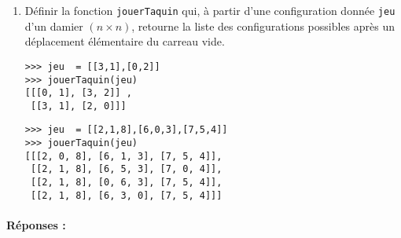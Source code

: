 \documentclass[11pt,a4paper]{article}
\begin{document}
\begin{enumerate}
\item Définir la fonction \texttt{jouerTaquin} qui, à partir d'une configuration 
	donnée \texttt{jeu} d'un damier $(n\times n)$, retourne la liste des 
	configurations possibles après un déplacement élémentaire du carreau vide.
	
\noindent\begin{minipage}[t]{7cm}\footnotesize
\begin{Verbatim}
>>> jeu  = [[3,1],[0,2]]
>>> jouerTaquin(jeu)
[[[0, 1], [3, 2]] , 
 [[3, 1], [2, 0]]]
\end{Verbatim}
\end{minipage}
 \hfill
\begin{minipage}[t]{7cm}\footnotesize
\begin{Verbatim}
>>> jeu  = [[2,1,8],[6,0,3],[7,5,4]]
>>> jouerTaquin(jeu)
[[[2, 0, 8], [6, 1, 3], [7, 5, 4]], 
 [[2, 1, 8], [6, 5, 3], [7, 0, 4]], 
 [[2, 1, 8], [0, 6, 3], [7, 5, 4]], 
 [[2, 1, 8], [6, 3, 0], [7, 5, 4]]]
\end{Verbatim}
\end{minipage}

\end{enumerate}

\paragraph{Réponses :}\mbox{}\\
\noindent\framebox[0.99\textwidth]{$\rule{0cm}{19cm}$}

\noindent\framebox[0.99\textwidth]{$\rule{0cm}{22cm}$}

\noindent\framebox[0.99\textwidth]{$\rule{0cm}{22cm}$}


\end{document}
